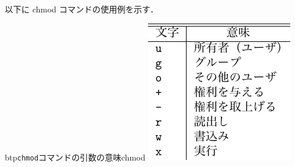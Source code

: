 以下に chmod コマンドの使用例を示す．

\begin{mytable}{btp}{\texttt{chmod}コマンドの引数の意味}{chmod}
  \includegraphics[scale=1.0]{Tbl/chmodOptions.pdf}
\end{mytable}



